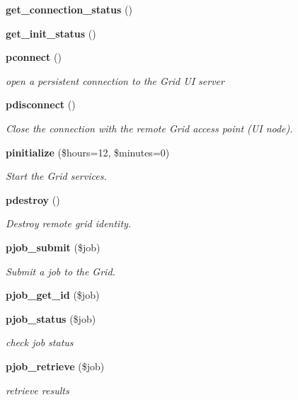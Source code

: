 \begin{CompactItemize}
{\bf get\_\-connection\_\-status} ()
\item 
{\bf get\_\-init\_\-status} ()
\item 
{\bf pconnect} ()
\begin{CompactList}\small\item\em open a persistent connection to the Grid UI server \item\end{CompactList}\item 
{\bf pdisconnect} ()
\begin{CompactList}\small\item\em Close the connection with the remote Grid access point (UI node). \item\end{CompactList}\item 
{\bf pinitialize} (\$hours=12, \$minutes=0)
\begin{CompactList}\small\item\em Start the Grid services. \item\end{CompactList}\item 
{\bf pdestroy} ()
\begin{CompactList}\small\item\em Destroy remote grid identity. \item\end{CompactList}\item 
{\bf pjob\_\-submit} (\$job)
\begin{CompactList}\small\item\em Submit a job to the Grid. \item\end{CompactList}\item 
{\bf pjob\_\-get\_\-id} (\$job)
\item 
{\bf pjob\_\-status} (\$job)
\begin{CompactList}\small\item\em check job status \item\end{CompactList}\item 
{\bf pjob\_\-retrieve} (\$job)
\begin{CompactList}\small\item\em retrieve results \item\end{CompactList}\end{CompactItemize}

